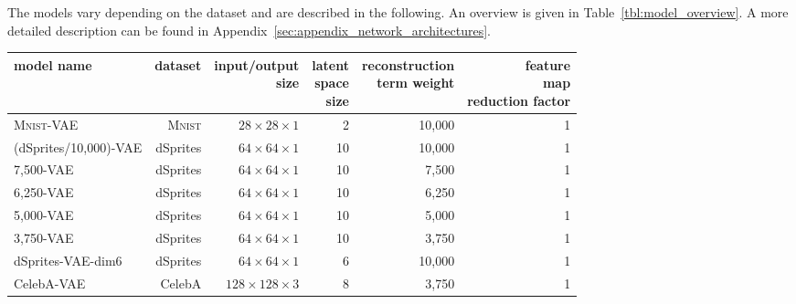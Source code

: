 The models vary depending on the dataset and are described in the following.
An overview is given in Table~\ref{tbl:model_overview}.
A more detailed description can be found in Appendix~\ref{sec:appendix_network_architectures}.
\begin{table}
    \centering
    \begin{tabular}{lrrrrr}
        \toprule
        model name              & dataset        & \parbox[t]{2cm}{\normalsize\raggedleft input/output\\size}       & \parbox[t]{2cm}{\normalsize\raggedleft latent\\space\\size} & \parbox[t]{2cm}{\normalsize\raggedleft reconstruction\\term weight} & \parbox[t]{2cm}{\normalsize\raggedleft feature\\map\\reduction factor} \\
        \midrule
        \textsc{Mnist}-\ac{VAE} & \textsc{Mnist} & $28\times 28\times 1$   & 2                 & 10,000                     & 1                            \\
        (dSprites/10,000)-\ac{VAE}       & dSprites       & $64\times 64\times 1$   & 10                & 10,000                     & 1                            \\
        7,500-\ac{VAE}          & dSprites       & $64\times 64\times 1$   & 10                & 7,500                      & 1                            \\
        6,250-\ac{VAE}          & dSprites       & $64\times 64\times 1$   & 10                & 6,250                      & 1                            \\
        5,000-\ac{VAE}          & dSprites       & $64\times 64\times 1$   & 10                & 5,000                      & 1                            \\
        3,750-\ac{VAE}          & dSprites       & $64\times 64\times 1$   & 10                & 3,750                      & 1                            \\
        dSprites-\ac{VAE}-dim6  & dSprites       & $64\times 64\times 1$   & 6                 & 10,000                     & 1                            \\
        CelebA-\ac{VAE}         & CelebA         & $128\times 128\times 3$ & 8                 & 3,750                      & 1                            \\
        \midrule

\end{tabular}
\end{table}
